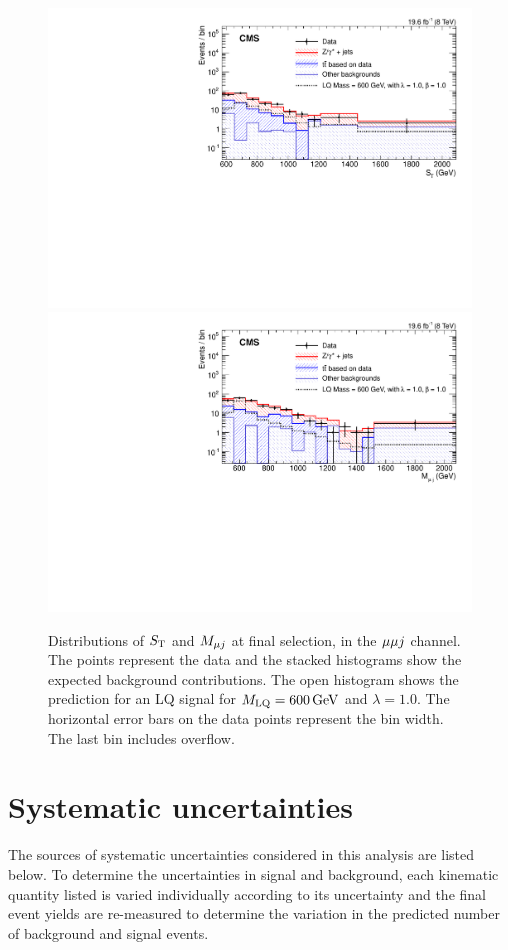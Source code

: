 \begin{figure}[!htb]
       \centering
       {\includegraphics[width=.75\textwidth]{Figures/Figures_mumu_ST_pf_mumu_single_Fullselection.pdf}}
       {\includegraphics[width=.75\textwidth]{Figures/Figures_mumu_M_singleLQ_mupfjet_Masshigh_Fullselection.pdf}}
       \caption{Distributions of $S_{\mathrm{T}}$ and $M_{{\mu} j}$ at final selection, in the ${\mu} {\mu} j$ channel.  The points represent the data and the stacked histograms show the expected background contributions.  The open histogram shows the prediction for an LQ signal for $M_{\text{\text{LQ}}}=600\,\text{Ge\hspace{-.08em}V}$ and $\lambda=1.0$.  The horizontal error bars on the data points represent the bin width.  The last bin includes overflow. \label{figapp:mufinalsel}}
\end{figure}

\section{Systematic uncertainties}
\label{systematics}

The sources of systematic uncertainties considered in this analysis are listed below.  To determine the uncertainties in signal and background, each kinematic quantity listed is varied individually according to its uncertainty and the final event yields are re-measured to determine the variation in the predicted number of background and signal events.

